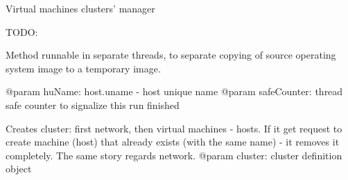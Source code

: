 \documentclass[a4paper,11pt,openany]{sphinxmanual}
\begin{document}
\begin{fulllineitems}
\label{ref-manual/XrdTest:XrdTest.ClusterManager.ClusterManager}
Virtual machines clusters' manager

\begin{fulllineitems}
\label{ref-manual/XrdTest:XrdTest.ClusterManager.ClusterManager.attachDisk}
TODO:

\end{fulllineitems}


\begin{fulllineitems}
\label{ref-manual/XrdTest:XrdTest.ClusterManager.ClusterManager.attachDisks}
\end{fulllineitems}


\begin{fulllineitems}
\label{ref-manual/XrdTest:XrdTest.ClusterManager.ClusterManager.copyImg}
Method runnable in separate threads, to separate copying of source
operating system image to a temporary image.

@param huName: host.uname - host unique name
@param safeCounter: thread safe counter to signalize this run finished

\end{fulllineitems}


\begin{fulllineitems}
\label{ref-manual/XrdTest:XrdTest.ClusterManager.ClusterManager.createCluster}
Creates cluster: first network, then virtual machines - hosts.
If it get request to create machine (host) that already exists (with the
same name) - it removes it completely. The same story regards network.
@param cluster: cluster definition object

\end{fulllineitems}


\end{fulllineitems}
\end{document}
